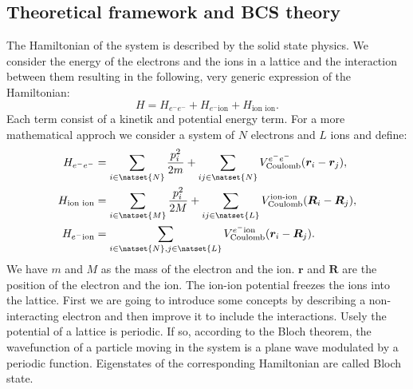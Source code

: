 \documentclass[../main.tex]{subfile}
\begin{document}
\subsection{Theoretical framework and BCS theory}
The Hamiltonian of the system is described by the solid state physics. We consider the energy of the electrons and the ions in a lattice and the interaction between them resulting in 
the following, very generic expression of the Hamiltonian:
\[
    H = H_{e^-e^-} + H_{e^-\text{ion}} + H_{\text{ion ion}}.
\]
Each term consist of a kinetik and potential energy term. For a more mathematical approch we consider a system of $N$ electrons and $L$ ions and define:
\begin{align*}
    H_{e^-e^-} &= \sum_{i \in \natset{N}} \frac{p_i^2}{2m} + \sum_{ij\in\natset{N}} V_{\text{Coulomb}}^{e^-e^-}(\bm{r}_i-\bm{r}_j), \\
    H_{\text{ion ion}} &=  \sum_{i \in \natset{M}} \frac{p_i^2}{2M} + \sum_{ij\in\natset{L}} V_{\text{Coulomb}}^{\text{ion-ion}}(\bm{R}_i-\bm{R}_j), \\
    H_{e^-\text{ion}} &= \sum_{i\in \natset{N},j\in \natset{L}} V_{\text{Coulomb}}^{e^-\text{ion}}(\bm{r}_i-\bm{R}_j).
\end{align*}
We have $m$ and $M$ as the mass of the electron and the ion. $\bm{r}$ and $\bm{R}$ are the position of the electron and the ion. The ion-ion potential
freezes the ions into the lattice. 
First we are going to introduce some concepts by describing a non-interacting electron and then improve it to include the interactions.
Usely the potential of a lattice is periodic. If so, according to the Bloch theorem, the wavefunction of a particle moving in the system is a plane wave modulated
by a periodic function. Eigenstates of the corresponding Hamiltonian are called Bloch state.
\end{document}
